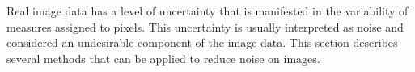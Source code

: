 Real image data has a level of uncertainty that is manifested in the
variability of measures assigned to pixels. This uncertainty is usually
interpreted as noise and considered an undesirable component of the image
data. This section describes several methods that can be applied to reduce
noise on images.












